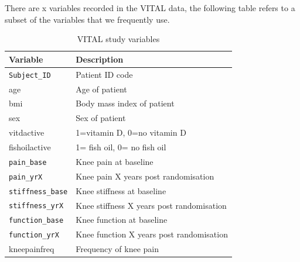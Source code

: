 \documentclass{article}
\begin{document}
There are x variables recorded in the VITAL data, the following table
refers to a subset of the variables that we frequently use.

\begin{table}[H]
\centering
\caption{VITAL study variables}
\label{}

\begin{tabular}{ll}
\toprule
Variable & Description\\
\midrule
\texttt{Subject\_ID} & Patient ID code\\
age & Age of patient\\
bmi & Body mass index of patient\\
sex & Sex of patient\\
vitdactive & 1=vitamin D, 0=no vitamin D\\
\addlinespace
fishoilactive & 1= fish oil, 0= no fish oil\\
\texttt{pain\_base} & Knee pain at baseline\\
\texttt{pain\_yrX} & Knee pain X years post randomisation\\
\texttt{stiffness\_base} & Knee stiffness at baseline\\
\texttt{stiffness\_yrX} & Knee stiffness X years post randomisation\\
\addlinespace
\texttt{function\_base} & Knee function at baseline\\
\texttt{function\_yrX} & Knee function X years post randomisation\\
kneepainfreq & Frequency of knee pain\\
\bottomrule
\end{tabular}
\end{table}
\end{document}

